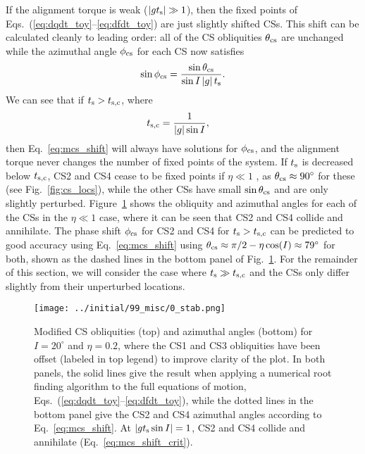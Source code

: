 \documentclass[
        fleqn,
        usenatbib,
    ]{mnras}
\newcommand*{\abs}[1]{\left|#1\right|}
\begin{document}
If the alignment torque is weak ($\abs{gt_{\rm s}} \gg 1$), then the fixed points of
Eqs.~(\ref{eq:dqdt_toy}--\ref{eq:dfdt_toy}) are just slightly shifted CSs. This
shift can be calculated cleanly to leading order: all of the CS obliquities
$\theta_{\rm cs}$ are unchanged while the azimuthal angle $\phi_{\rm cs}$ for
each CS now satisfies
\begin{equation}
    \sin \phi_{\rm cs} = \frac{\sin\theta_{\rm cs}}{\sin I \abs{g}t_{\rm s}}.
        \label{eq:mcs_shift}
\end{equation}
We can see that if $t_{\rm s} > t_{\rm s, c}$, where
\begin{align}
    t_{\rm s, c} &= \frac{1}{\abs{g}\sin I},\label{eq:mcs_shift_crit}
\end{align}
then Eq.~\eqref{eq:mcs_shift} will always have solutions for $\phi_{\rm cs}$,
and the alignment torque never changes the number of fixed points of the system.
If $t_{\rm s}$ is decreased below $t_{\rm s, c}$, CS2 and CS4 cease to be
fixed points if $\eta \ll 1$ \citep[as first noted in][]{fabrycky_otides}, as
$\theta_{\rm cs} \approx 90^\circ$ for these (see Fig.~\ref{fig:cs_locs}), while
the other CSs have small $\sin \theta_{\rm cs}$ and are only slightly perturbed.
Figure~\ref{fig:mcs} shows the obliquity and azimuthal angles for each of the
CSs in the $\eta \ll 1$ case, where it can be seen that CS2 and CS4 collide and
annihilate. The phase shift $\phi_{\rm cs}$ for CS2 and CS4 for $t_{\rm s} >
t_{\rm s, c}$ can be predicted to good accuracy using Eq.~\eqref{eq:mcs_shift}
using $\theta_{\rm cs} \approx \pi/2 - \eta \cos (I) \approx 79^\circ$
\citep{su2020} for both, shown as the dashed lines in the bottom panel of
Fig.~\ref{fig:mcs}. For the remainder of this section, we will consider the case
where $t_{\rm s} \gg t_{\rm s, c}$ and the CSs only differ slightly from their
unperturbed locations.
\begin{figure}
    \centering
    \texttt{[image: ../initial/99\_misc/0\_stab.png]}
    \caption{Modified CS obliquities (top) and azimuthal angles (bottom) for $I
    = 20^\circ$ and $\eta = 0.2$, where the CS1 and CS3 obliquities have been
    offset (labeled in top legend) to improve clarity of the plot. In both
    panels, the solid lines give the result when applying a numerical root
    finding algorithm to the full equations of motion,
    Eqs.~(\ref{eq:dqdt_toy}--\ref{eq:dfdt_toy}), while the dotted lines in the
    bottom panel give the CS2 and CS4 azimuthal angles according to
    Eq.~\eqref{eq:mcs_shift}. At $\abs{gt_{\rm s} \sin I} = 1$, CS2 and CS4
    collide and annihilate (Eq.~\ref{eq:mcs_shift_crit}).}\label{fig:mcs}
\end{figure}
\end{document}
